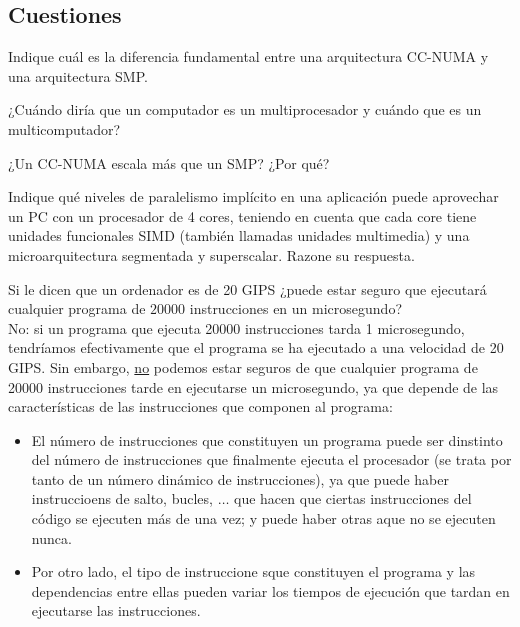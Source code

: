 \subsection{Cuestiones}
\begin{cuestion}
    Indique cuál es la diferencia fundamental entre una arquitectura CC-NUMA y una arquitectura
    SMP.
\end{cuestion}

\begin{cuestion}
    ¿Cuándo diría que un computador es un multiprocesador y cuándo que es un multicomputador?
\end{cuestion}

\begin{cuestion}
    ¿Un CC-NUMA escala más que un SMP? ¿Por qué?
\end{cuestion}

\begin{cuestion}
    Indique qué niveles de paralelismo implícito en una aplicación puede aprovechar un PC con un
    procesador de 4 cores, teniendo en cuenta que cada core tiene unidades funcionales SIMD (también
    llamadas unidades multimedia) y una microarquitectura segmentada y superscalar. Razone su respuesta.
\end{cuestion}

\begin{cuestion}
    Si le dicen que un ordenador es de 20 GIPS ¿puede estar seguro que ejecutará cualquier
    programa de $20000$ instrucciones en un microsegundo?\\

    No: si un programa que ejecuta 20000 instrucciones tarda 1 microsegundo, tendríamos efectivamente que el programa se ha ejecutado a una velocidad de 20 GIPS. Sin embargo, \ul{no} podemos estar seguros de que cualquier programa de 20000 instrucciones tarde en ejecutarse un microsegundo, ya que depende de las características de las instrucciones que componen al programa:
    \begin{itemize}
        \item El número de instrucciones que constituyen un programa puede ser dinstinto del número de instrucciones que finalmente ejecuta el procesador (se trata por tanto de un número dinámico de instrucciones), ya que puede haber instruccioens de salto, bucles, $\ldots$ que hacen que ciertas instrucciones del código se ejecuten más de una vez; y puede haber otras aque no se ejecuten nunca.
        \item Por otro lado, el tipo de instruccione sque constituyen el programa y las dependencias entre ellas pueden variar los tiempos de ejecución que tardan en ejecutarse las instrucciones.
    \end{itemize}
\end{cuestion}

